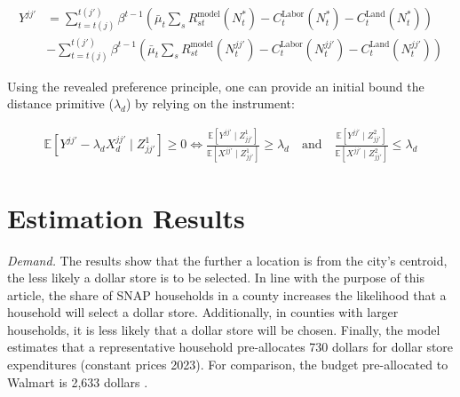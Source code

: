 \documentclass[11.5pt]{article}
\begin{document}
  \begin{align*}
      Y^{jj'} & =  \sum_{t=t(j)}^{t(j')}\beta^{t-1} \left(\bar \mu_t\sum_{s}   R_{st}^\text{model}(N_t^*)- C_t^\text{Labor} (N_t^*) - C_t^\text{Land} (N_t^*)\right)  \\
      & -  \sum_{t=t(j)}^{t(j')} \beta^{t-1} \left(\bar \mu_t\sum_{s}   R_{st}^\text{model}(N_t^{jj'}) - C_t^\text{Labor} (N_t^{jj'}) - C_t^\text{Land} (N_t^{jj'}) \right) 
  \end{align*}
  
  
  
  Using the revealed preference principle, one can provide an initial bound the distance primitive ($\lambda_d$) by relying on the instrument:
  


      \begin{align}
          \mathbb{E}[Y^{jj'}-\lambda_d X_d^{jj'} \mid Z^{1}_{jj'}] \geq 0 \iff \frac{\mathbb{E}[Y^{jj'}\mid Z^{1}_{jj'}]}{\mathbb{E}[X^{jj'}\mid Z^{1}_{jj'}]}\geq \lambda_d  \quad \text{and} \quad  \frac{\mathbb{E}[Y^{jj'}\mid Z^{2}_{jj'}]}{\mathbb{E}[X^{jj'}\mid Z^{2}_{jj'}]}\leq \lambda_d 
      \end{align}


    
     
     
     
\newpage


\section{Estimation Results}
\textit{Demand.} The results show that the further a location is from the city’s centroid, the less likely a dollar store is to be selected. In line with the purpose of this article, the share of SNAP households in a county increases the likelihood that a household will select a dollar store. Additionally, in counties with larger households, it is less likely that a dollar store will be chosen. Finally, the model estimates that a representative household pre-allocates 730 dollars for dollar store expenditures (constant prices 2023). For comparison, the budget pre-allocated to Walmart is 2,633 dollars \cite{holmes2011diffusion}.
\end{document}
